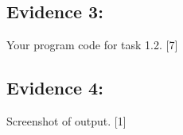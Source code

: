 \subsection*{Evidence 3: }

Your program code for task 1.2. \hfill{}{[}7{]}

\subsection*{Evidence 4: }

Screenshot of output. \hfill{}{[}1{]}